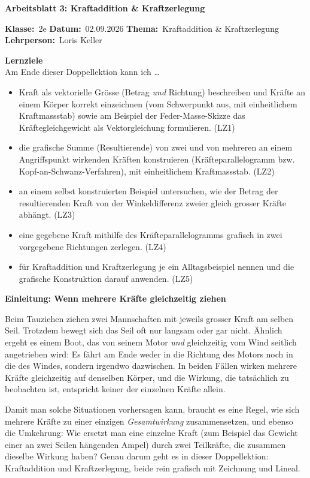 \documentclass[addpoints,11pt,a4paper]{exam}
\newenvironment{infobox}{%
  \par\addvspace{10pt}\noindent
}{%
  \par\addvspace{10pt}
}
\newenvironment{beispielbox}[1][Beispiel]{%
  \par\addvspace{10pt}\noindent\textbf{#1}\par\smallskip\noindent
}{%
  \par\addvspace{10pt}
}
\newcommand{\Kopfzeile}[4]{%
  \begin{titlebox}
    {\color{white}\sffamily\bfseries\Large #4}
  \end{titlebox}
  \vspace{0.5em}
  \noindent\textbf{Klasse:}~#1 \hfill \textbf{Datum:}~#2 \hfill \textbf{Thema:}~#3
    \hfill \textbf{Lehrperson:}~Loris Keller
  \vspace{0.8em}
  \lhead{\textcolor{darkgray}{#3}}
  \rhead{\textcolor{darkgray}{#4}}
}
\newcommand{\Klasse}{2e}
\newcommand{\Datum}{02.09.2026}
\newcommand{\Thema}{Kraftaddition \& Kraftzerlegung}
\newcommand{\ArbeitsblattTitel}{Arbeitsblatt 3: Kraftaddition \& Kraftzerlegung}
\begin{document}
\Kopfzeile{\Klasse}{\Datum}{\Thema}{\ArbeitsblattTitel}

\begin{infobox}
\textbf{Lernziele}\\
Am Ende dieser Doppellektion kann ich \dots
\begin{itemize}[leftmargin=1.2cm,itemsep=0.3em]
  \item Kraft als vektorielle Grösse (Betrag \emph{und} Richtung) beschreiben und Kräfte an einem Körper korrekt einzeichnen (vom Schwerpunkt aus, mit einheitlichem Kraftmassstab) sowie am Beispiel der Feder-Masse-Skizze das Kräftegleichgewicht als Vektorgleichung formulieren. (LZ1)
  \item die grafische Summe (Resultierende) von zwei und von mehreren an einem Angriffspunkt wirkenden Kräften konstruieren (Kräfteparallelogramm bzw. Kopf-an-Schwanz-Verfahren), mit einheitlichem Kraftmassstab. (LZ2)
  \item an einem selbst konstruierten Beispiel untersuchen, wie der Betrag der resultierenden Kraft von der Winkeldifferenz zweier gleich grosser Kräfte abhängt. (LZ3)
  \item eine gegebene Kraft mithilfe des Kräfteparallelogramms grafisch in zwei vorgegebene Richtungen zerlegen. (LZ4)
  \item für Kraftaddition und Kraftzerlegung je ein Alltagsbeispiel nennen und die grafische Konstruktion darauf anwenden. (LZ5)
\end{itemize}
\end{infobox}

\begin{beispielbox}[Einleitung: Wenn mehrere Kräfte gleichzeitig ziehen]
Beim Tauziehen ziehen zwei Mannschaften mit jeweils grosser Kraft am selben
Seil. Trotzdem bewegt sich das Seil oft nur langsam oder gar nicht. Ähnlich
ergeht es einem Boot, das von seinem Motor \emph{und} gleichzeitig vom Wind
seitlich angetrieben wird: Es fährt am Ende weder in die Richtung des Motors
noch in die des Windes, sondern irgendwo dazwischen. In beiden Fällen wirken
mehrere Kräfte gleichzeitig auf denselben Körper, und die Wirkung, die
tatsächlich zu beobachten ist, entspricht keiner der einzelnen Kräfte allein.

Damit man solche Situationen vorhersagen kann, braucht es eine Regel, wie
sich mehrere Kräfte zu einer einzigen \emph{Gesamtwirkung} zusammensetzen,
und ebenso die Umkehrung: Wie ersetzt man eine einzelne Kraft (zum Beispiel
das Gewicht einer an zwei Seilen hängenden Ampel) durch zwei Teilkräfte, die
zusammen dieselbe Wirkung haben? Genau darum geht es in dieser Doppellektion:
Kraftaddition und Kraftzerlegung, beide rein grafisch mit Zeichnung und
Lineal.
\end{beispielbox}
\end{document}
